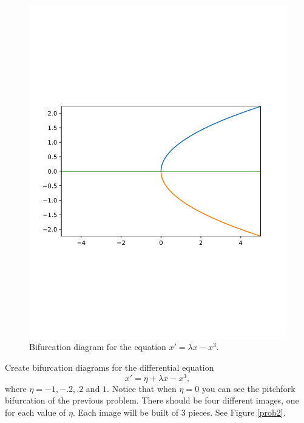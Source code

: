 \begin{figure}
\centering
\includegraphics[width=\textwidth]{prob1.pdf}
\caption{Bifurcation diagram for the equation $x' = \lambda x - x^3$.}
\label{prob1}
\end{figure}

\begin{problem}
Create bifurcation diagrams for the differential equation
\[x' = \eta + \lambda x-x^3,\]
where $\eta = -1, -.2, .2$ and $1.$  Notice that when $\eta = 0$ you can see the pitchfork bifurcation of the previous problem.
There should be four different images, one for each value of $\eta$.
Each image will be built of 3 pieces.
See Figure \ref{prob2}.
\end{problem}

